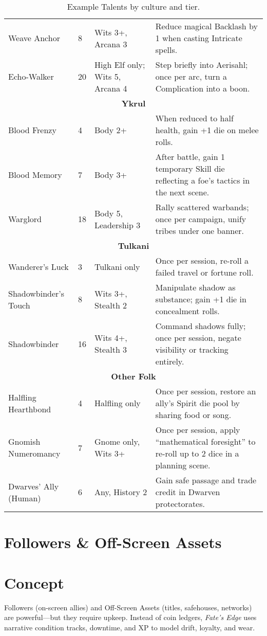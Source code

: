 \documentclass[12pt]{book}
\begin{document}
\begin{table}[h]
\begin{tabular}{|p{3cm}|p{2cm}|p{3cm}|p{6cm}|}
Weave Anchor & 8 & Wits 3+, Arcana 3 & Reduce magical Backlash by 1 when casting Intricate spells. \\
Echo-Walker & 20 & High Elf only; Wits 5, Arcana 4 & Step briefly into Aerisahl; once per arc, turn a Complication into a boon. \\
\hline
\multicolumn{4}{|c|}{\textbf{Ykrul}} \\
\hline
Blood Frenzy & 4 & Body 2+ & When reduced to half health, gain +1 die on melee rolls. \\
Blood Memory & 7 & Body 3+ & After battle, gain 1 temporary Skill die reflecting a foe’s tactics in the next scene. \\
Warglord & 18 & Body 5, Leadership 3 & Rally scattered warbands; once per campaign, unify tribes under one banner. \\
\hline
\multicolumn{4}{|c|}{\textbf{Tulkani}} \\
\hline
Wanderer’s Luck & 3 & Tulkani only & Once per session, re-roll a failed travel or fortune roll. \\
Shadowbinder’s Touch & 8 & Wits 3+, Stealth 2 & Manipulate shadow as substance; gain +1 die in concealment rolls. \\
Shadowbinder & 16 & Wits 4+, Stealth 3 & Command shadows fully; once per session, negate visibility or tracking entirely. \\
\hline
\multicolumn{4}{|c|}{\textbf{Other Folk}} \\
\hline
Halfling Hearthbond & 4 & Halfling only & Once per session, restore an ally’s Spirit die pool by sharing food or song. \\
Gnomish Numeromancy & 7 & Gnome only, Wits 3+ & Once per session, apply “mathematical foresight” to re-roll up to 2 dice in a planning scene. \\
Dwarves’ Ally (Human) & 6 & Any, History 2 & Gain safe passage and trade credit in Dwarven protectorates. \\
\hline
\end{tabular}
\caption{Example Talents by culture and tier.}
\end{table}

\section{Followers \& Off-Screen Assets}
\label{chap:followers-assets}

\section{Concept}
Followers (on-screen allies) and Off-Screen Assets (titles, safehouses, networks) are powerful—but they require upkeep. Instead of coin ledgers, \emph{Fate’s Edge} uses narrative condition tracks, downtime, and XP to model drift, loyalty, and wear.
\end{document}

